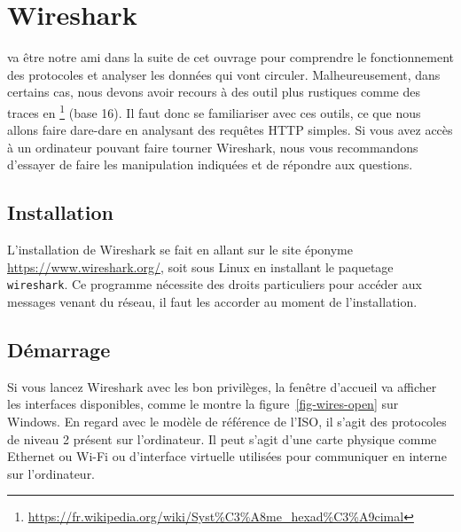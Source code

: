 \cleardoublepage

\chapter {Wireshark}

 va être notre ami dans la suite de cet ouvrage pour comprendre le fonctionnement des protocoles et analyser les données qui vont circuler. Malheureusement, dans certains cas, nous devons avoir recours à des outil plus rustiques comme des traces en \footnote{\url{https://fr.wikipedia.org/wiki/Syst\%C3\%A8me\_hexad\%C3\%A9cimal}} (base 16).  Il faut donc se familiariser avec ces outils, ce que nous allons faire dare-dare en analysant des requêtes HTTP simples. Si vous avez accès à un ordinateur pouvant faire tourner Wireshark, nous vous recommandons d'essayer de faire les manipulation indiquées et de répondre aux questions.

\section{Installation}

L'installation de Wireshark se fait en allant sur le site éponyme \url{https://www.wireshark.org/}, soit sous Linux en installant le paquetage \texttt{wireshark}. Ce programme nécessite des droits particuliers pour accéder aux messages venant du réseau, il faut les accorder au moment de l'installation.

\section{Démarrage}

Si vous lancez Wireshark avec les bon privilèges, la fenêtre d'accueil va afficher les interfaces disponibles, comme le montre la figure~\vref{fig-wires-open} sur Windows. En regard avec le modèle de référence de l'\ac{ISO}, il s'agit des protocoles de niveau 2 présent sur l'ordinateur. Il peut s'agit d'une carte physique comme Ethernet ou Wi-Fi ou d'interface virtuelle utilisées pour communiquer en interne sur l'ordinateur. 

